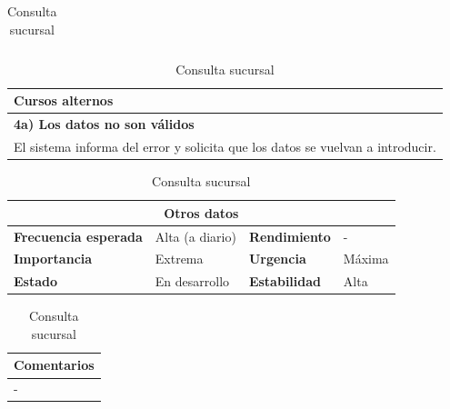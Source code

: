 \documentclass[12pt,spanish]{article}
\begin{document}
\begin{table}[H]
\begin{tabular}{|m{4pt}|m{7.33cm}|m{4pt}|m{7.33cm}|}
\end{tabular}

\vspace{1cm}

\begin{tabular}{|m{10pt}|m{7.15cm}|m{10pt}|m{7.15cm}|}
\hline
\multicolumn{4}{|m{16.2cm}|}{\textbf{Cursos alternos}} \\
\hline
\multicolumn{4}{|m{16.2cm}|}{\textbf{4a) Los datos no son válidos}} \\
\hline
\multicolumn{4}{|m{16.2cm}|}{El sistema informa del error y solicita que los datos se vuelvan a introducir.} \\
\hline
\end{tabular}

\vspace{1cm}

\begin{tabular}{|m{3.72cm}|m{3.72cm}|m{3.72cm}|m{3.72cm}|}
\hline
\multicolumn{4}{|c|}{\textbf{Otros datos}} \\
\hline
\textbf{Frecuencia esperada} & Alta (a diario) & \textbf{Rendimiento} & - \\
\hline
\textbf{Importancia} & Extrema & \textbf{Urgencia} & Máxima \\
\hline
\textbf{Estado} & En desarrollo & \textbf{Estabilidad} & Alta \\
\hline
\end{tabular}

\vspace{1cm}

\begin{tabular}{|m{16.2cm}|}
\hline
\textbf{Comentarios} \\
\hline
- \\
\hline
\end{tabular}

\caption{Consulta sucursal}

\end{table}

\end{document}

